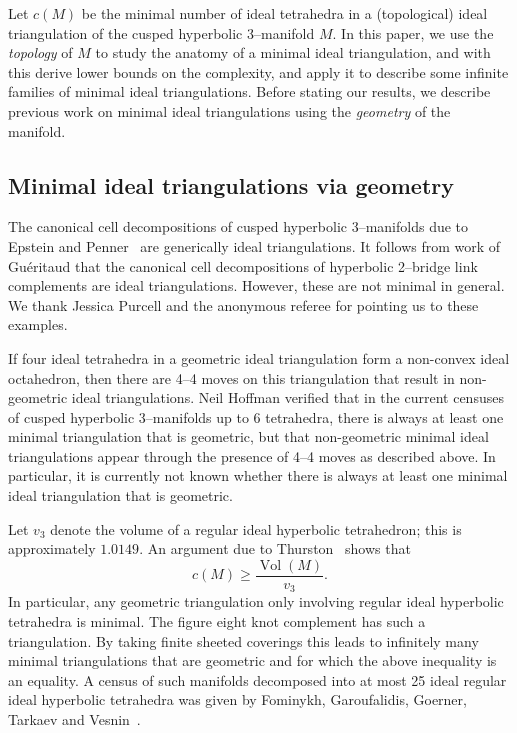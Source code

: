 \documentclass[a4paper]{gtart}
\def\Vol{\operatorname{Vol}}
\def\manifold{M}
\theoremstyle{plain}
\theoremstyle{definition}
\theoremstyle{remark}
\numberwithin{equation}{section}
\begin{document}
Let $c(\manifold)$ be the minimal number of ideal tetrahedra in a (topological) ideal triangulation of the 
cusped hyperbolic 3--manifold $\manifold.$ In this paper, we use the \emph{topology} of $\manifold$ to study the anatomy of a minimal ideal triangulation, and with this derive lower bounds on the complexity, and apply it to describe some infinite families of minimal ideal triangulations.
Before stating our results, we describe previous work on minimal ideal triangulations using the \emph{geometry} of the manifold.


\subsection{Minimal ideal triangulations via geometry}

The canonical cell decompositions of cusped hyperbolic 3--manifolds due to Epstein and Penner~\cite{Epstein-euclidean-1988} are generically ideal triangulations. It follows from work of Gu\'eritaud \cite[Theorem 2.1.7 in Section 2.1.4]{GueritaudPhDThesis} that the canonical cell decompositions of hyperbolic 2--bridge link complements are ideal triangulations. However, these are not minimal in general. We thank Jessica Purcell and the anonymous referee for pointing us to these examples.

If four ideal tetrahedra in a geometric ideal triangulation form a non-convex ideal octahedron, then there are 4--4 moves on this triangulation that result in non-geometric ideal triangulations. Neil Hoffman verified that in the current censuses of cusped hyperbolic 3--manifolds up to 6 tetrahedra, there is always at least one minimal triangulation that is geometric, but that non-geometric minimal ideal triangulations appear through the presence of 4--4 moves as described above. In particular, it is currently not known whether there is always at least one minimal ideal triangulation that is geometric.

Let $v_3$ denote the volume of a regular ideal hyperbolic tetrahedron; this is approximately $1.0149.$ An argument due to Thurston~\cite{thurston78-lectures} shows that 
\begin{equation}\label{eq:volume bound}
c(\manifold) \ge \frac{\Vol(\manifold)}{v_3}.
\end{equation}
In particular, any geometric triangulation only involving regular ideal hyperbolic tetrahedra is minimal. The figure eight knot complement has such a triangulation. By taking finite sheeted  coverings this leads to infinitely many minimal triangulations that are geometric and for which the above inequality is an equality. A census of such manifolds decomposed into at most 25 ideal regular ideal hyperbolic tetrahedra was given by Fominykh, Garoufalidis, Goerner, Tarkaev and Vesnin~\cite{Fominykh-census-2016}. 
\end{document}
